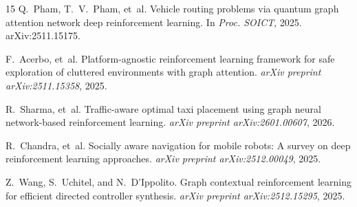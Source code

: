 \documentclass{article}
\begin{document}
\begin{thebibliography}{15}
Q.~Pham, T.~V.~Pham, et~al.
\newblock Vehicle routing problems via quantum graph attention network deep reinforcement learning.
\newblock In \emph{Proc. SOICT}, 2025.
\newblock arXiv:2511.15175.

F.~Acerbo, et~al.
\newblock Platform-agnostic reinforcement learning framework for safe exploration of cluttered environments with graph attention.
\newblock \emph{arXiv preprint arXiv:2511.15358}, 2025.

R.~Sharma, et~al.
\newblock Traffic-aware optimal taxi placement using graph neural network-based reinforcement learning.
\newblock \emph{arXiv preprint arXiv:2601.00607}, 2026.

R.~Chandra, et~al.
\newblock Socially aware navigation for mobile robots: A survey on deep reinforcement learning approaches.
\newblock \emph{arXiv preprint arXiv:2512.00049}, 2025.

Z.~Wang, S.~Uchitel, and N.~D'Ippolito.
\newblock Graph contextual reinforcement learning for efficient directed controller synthesis.
\newblock \emph{arXiv preprint arXiv:2512.15295}, 2025.

\end{thebibliography}
\end{document}
